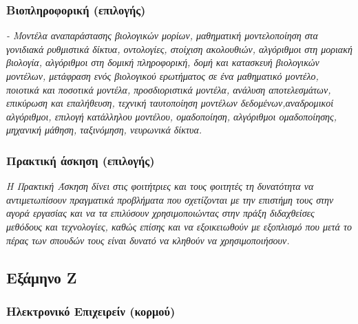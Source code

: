 \hypertarget{ux3b2ux3b9ux3bfux3c0ux3bbux3b7ux3c1ux3bfux3c6ux3bfux3c1ux3b9ux3baux3ae-ux3b5ux3c0ux3b9ux3bbux3bfux3b3ux3aeux3c2}{%
\subsubsection{Βιοπληροφορική
(επιλογής)}\label{ux3b2ux3b9ux3bfux3c0ux3bbux3b7ux3c1ux3bfux3c6ux3bfux3c1ux3b9ux3baux3ae-ux3b5ux3c0ux3b9ux3bbux3bfux3b3ux3aeux3c2}}

\emph{- Μοντέλα αναπαράστασης βιολογικών μορίων, μαθηματική
μοντελοποίηση στα γονιδιακά ρυθμιστικά δίκτυα, οντολογίες, στοίχιση
ακολουθιών, αλγόριθμοι στη μοριακή βιολογία, αλγόριθμοι στη δομική
πληροφορική, δομή και κατασκευή βιολογικών μοντέλων, μετάφραση ενός
βιολογικού ερωτήματος σε ένα μαθηματικό μοντέλο, ποιοτικά και ποσοτικά
μοντέλα, προσδιοριστικά μοντέλα, ανάλυση αποτελεσμάτων, επικύρωση και
επαλήθευση, τεχνική ταυτοποίηση μοντέλων δεδομένων,αναδρομικοί
αλγόριθμοι, επιλογή κατάλληλου μοντέλου, ομαδοποίηση, αλγόριθμοι
ομαδοποίησης, μηχανική μάθηση, ταξινόμηση, νευρωνικά δίκτυα.}

\hypertarget{ux3c0ux3c1ux3b1ux3baux3c4ux3b9ux3baux3ae-ux3acux3c3ux3baux3b7ux3c3ux3b7-ux3b5ux3c0ux3b9ux3bbux3bfux3b3ux3aeux3c2}{%
\subsubsection{Πρακτική άσκηση
(επιλογής)}\label{ux3c0ux3c1ux3b1ux3baux3c4ux3b9ux3baux3ae-ux3acux3c3ux3baux3b7ux3c3ux3b7-ux3b5ux3c0ux3b9ux3bbux3bfux3b3ux3aeux3c2}}

\emph{Η Πρακτική Άσκηση δίνει στις φοιτήτριες και τους φοιτητές τη
δυνατότητα να αντιμετωπίσουν πραγματικά προβλήματα που σχετίζονται με
την επιστήμη τους στην αγορά εργασίας και να τα επιλύσουν
χρησιμοποιώντας στην πράξη διδαχθείσες μεθόδους και τεχνολογίες, καθώς
επίσης και να εξοικειωθούν με εξοπλισμό που μετά το πέρας των σπουδών
τους είναι δυνατό να κληθούν να χρησιμοποιήσουν.}

\hypertarget{ux3b5ux3beux3acux3bcux3b7ux3bdux3bf-ux3b6}{%
\subsection{Εξάμηνο Ζ}\label{ux3b5ux3beux3acux3bcux3b7ux3bdux3bf-ux3b6}}

\hypertarget{ux3b7ux3bbux3b5ux3baux3c4ux3c1ux3bfux3bdux3b9ux3baux3cc-ux3b5ux3c0ux3b9ux3c7ux3b5ux3b9ux3c1ux3b5ux3afux3bd-ux3baux3bfux3c1ux3bcux3bfux3cd}{%
\subsubsection{Ηλεκτρονικό Επιχειρείν
(κορμού)}\label{ux3b7ux3bbux3b5ux3baux3c4ux3c1ux3bfux3bdux3b9ux3baux3cc-ux3b5ux3c0ux3b9ux3c7ux3b5ux3b9ux3c1ux3b5ux3afux3bd-ux3baux3bfux3c1ux3bcux3bfux3cd}}

